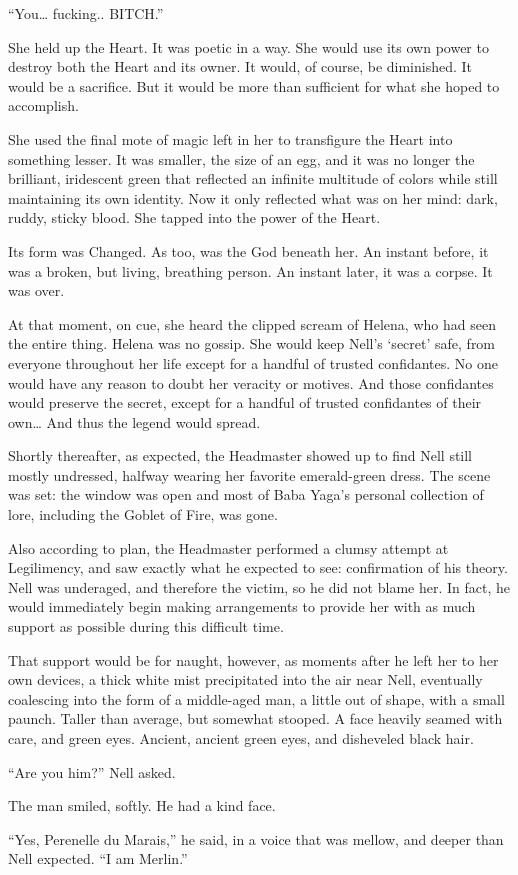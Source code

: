 “You… fucking.. BITCH.”

She held up the Heart. It was poetic in a way. She would use its own power to destroy both the Heart and its owner. It would, of course, be diminished. It would be a sacrifice. But it would be more than sufficient for what she hoped to accomplish.

She used the final mote of magic left in her to transfigure the Heart into something lesser. It was smaller, the size of an egg, and it was no longer the brilliant, iridescent green that reflected an infinite multitude of colors while still maintaining its own identity. Now it only reflected what was on her mind: dark, ruddy, sticky blood. She tapped into the power of the Heart.

Its form was Changed. As too, was the God beneath her. An instant before, it was a broken, but living, breathing person. An instant later, it was a corpse. It was over.

At that moment, on cue, she heard the clipped scream of Helena, who had seen the entire thing. Helena was no gossip. She would keep Nell’s ‘secret’ safe, from everyone throughout her life except for a handful of trusted confidantes. No one would have any reason to doubt her veracity or motives. And those confidantes would preserve the secret, except for a handful of trusted confidantes of their own… And thus the legend would spread.

Shortly thereafter, as expected, the Headmaster showed up to find Nell still mostly undressed, halfway wearing her favorite emerald-green dress. The scene was set: the window was open and most of Baba Yaga’s personal collection of lore, including the Goblet of Fire, was gone.

Also according to plan, the Headmaster performed a clumsy attempt at Legilimency, and saw exactly what he expected to see: confirmation of his theory. Nell was underaged, and therefore the victim, so he did not blame her. In fact, he would immediately begin making arrangements to provide her with as much support as possible during this difficult time.

That support would be for naught, however, as moments after he left her to her own devices, a thick white mist precipitated into the air near Nell, eventually coalescing into the form of a middle-aged man, a little out of shape, with a small paunch. Taller than average, but somewhat stooped.  A face heavily seamed with care, and green eyes.  Ancient, ancient green eyes, and disheveled black hair.

“Are you him?” Nell asked.

The man smiled, softly.  He had a kind face.

“Yes, Perenelle du Marais,” he said, in a voice that was mellow, and deeper than Nell expected. “I am Merlin.”






